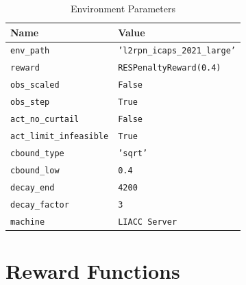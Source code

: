 		
\begin{table}[H]
	\centering
	\caption{Environment Parameters}
	\begin{tabular}{ll}
		
		\toprule
		\textbf{Name} & \textbf{Value} \\
		\midrule
		\texttt{env\_path} & \texttt{'l2rpn\_icaps\_2021\_large'} \\
		\texttt{reward} & \texttt{RESPenaltyReward(0.4)}\\
		\texttt{obs\_scaled} & \texttt{False} \\
		\texttt{obs\_step} & \texttt{True} \\
		\texttt{act\_no\_curtail} & \texttt{False} \\
		\texttt{act\_limit\_infeasible} & \texttt{True} \\
		\texttt{cbound\_type} & \texttt{'sqrt'} \\
		\texttt{cbound\_low} & \texttt{0.4} \\
		\texttt{decay\_end} & \texttt{4200} \\
		\texttt{decay\_factor} & \texttt{3} \\
		\texttt{machine} & \texttt{LIACC Server} \\
		\bottomrule
	\end{tabular}
	\label{tab:env-params-values}
\end{table}

\section{Reward Functions}



